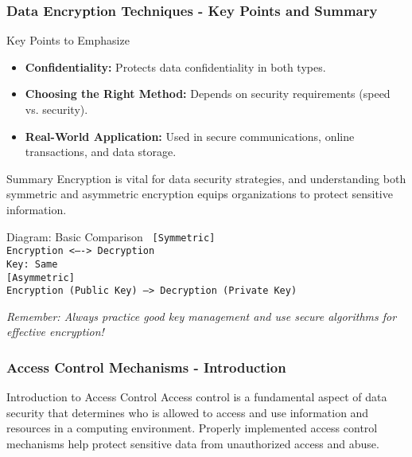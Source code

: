 \documentclass{beamer}
\begin{document}
\begin{frame}[fragile]
    \frametitle{Data Encryption Techniques - Key Points and Summary}
    \begin{block}{Key Points to Emphasize}
        \begin{itemize}
            \item \textbf{Confidentiality:} Protects data confidentiality in both types.
            \item \textbf{Choosing the Right Method:} Depends on security requirements (speed vs. security).
            \item \textbf{Real-World Application:} Used in secure communications, online transactions, and data storage.
        \end{itemize}
    \end{block}

    \begin{block}{Summary}
        Encryption is vital for data security strategies, and understanding both symmetric and asymmetric encryption equips organizations to protect sensitive information.
    \end{block}

    \begin{block}{Diagram: Basic Comparison}
        \texttt{
            [Symmetric] \\
            Encryption <----> Decryption \\
            Key: Same \\

            [Asymmetric] \\
            Encryption (Public Key) ---> Decryption (Private Key)
        }
    \end{block}

    \textit{Remember: Always practice good key management and use secure algorithms for effective encryption!}
\end{frame}

\begin{frame}[fragile]
    \frametitle{Access Control Mechanisms - Introduction}
    \begin{block}{Introduction to Access Control}
        Access control is a fundamental aspect of data security that determines who is allowed to access and use information and resources in a computing environment. 
        Properly implemented access control mechanisms help protect sensitive data from unauthorized access and abuse.
    \end{block}
\end{frame}
\end{document}

